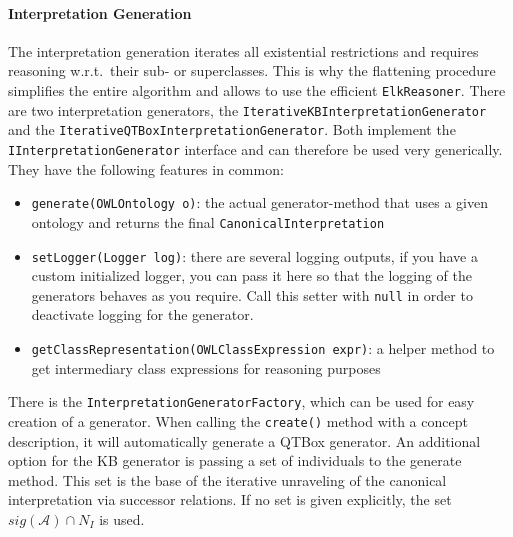 \documentclass{article}
\begin{document}
\paragraph{Interpretation Generation}
The interpretation generation iterates all existential restrictions and requires
reasoning w.r.t.\ their sub- or superclasses. This is why the flattening
procedure simplifies the entire algorithm and allows to use the efficient
\texttt{ElkReasoner}. There are two interpretation generators, the
\texttt{IterativeKBInterpretationGenerator} and the
\texttt{IterativeQTBoxInterpretationGenerator}. Both implement the
\texttt{IInterpretationGenerator} interface and can therefore be used very
generically. They have the following features in common:
\begin{itemize}
  \item \texttt{generate(OWLOntology o)}: the actual generator-method that uses
  a given ontology and returns the final \texttt{CanonicalInterpretation}
  \item \texttt{setLogger(Logger log)}: there are several logging outputs, if
  you have a custom initialized logger, you can pass it here so that the logging
  of the generators behaves as you require. Call this setter with \texttt{null}
  in order to deactivate logging for the generator.
  \item \texttt{getClassRepresentation(OWLClassExpression expr)}: a helper
  method to get intermediary class expressions for reasoning purposes
\end{itemize}

There is the \texttt{InterpretationGeneratorFactory}, which can be used for easy
creation of a generator. When calling the \texttt{create()} method with a
concept description, it will automatically generate a QTBox generator. An
additional option for the KB generator is passing a set of individuals to the
generate method. This set is the base of the iterative unraveling of the
canonical interpretation via successor relations. If no set is given explicitly,
the set $sig(\mathcal{A}) \cap N_I$ is used.
\end{document}
